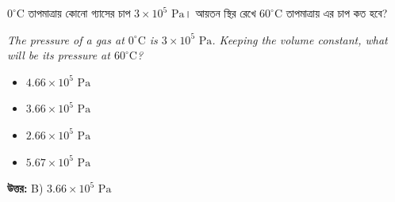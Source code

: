 \documentclass[12pt, a4paper]{article}
\begin{document}
\vspace{2em}
\begin{tcolorbox}[questionbox={প্রশ্ন (Question) 2}]
    \noindent
    $0^\circ\text{C}$ তাপমাত্রায় কোনো গ্যাসের চাপ $3 \times 10^5\text{ Pa}$। আয়তন স্থির রেখে $60^\circ\text{C}$ তাপমাত্রায় এর চাপ কত হবে?
    
    \vspace{0.8em}
    \begin{english}
    \noindent\textit{\color{darkgray}
    The pressure of a gas at $0^\circ\text{C}$ is $3 \times 10^5\text{ Pa}$. Keeping the volume constant, what will be its pressure at $60^\circ\text{C}$?
    }
    \end{english}
\end{tcolorbox}

\begin{itemize}[label={}, leftmargin=1cm, itemsep=0.5em]
    \item[\textbf{A)}] $4.66 \times 10^5\text{ Pa}$
    \item[\textbf{B)}] $3.66 \times 10^5\text{ Pa}$
    \item[\textbf{C)}] $2.66 \times 10^5\text{ Pa}$
    \item[\textbf{D)}] $5.67 \times 10^5\text{ Pa}$
\end{itemize}

\vspace{0.5em}
\begin{tcolorbox}[answerbox]
    \textbf{\color{success} উত্তর:} B) $3.66 \times 10^5\text{ Pa}$
\end{tcolorbox}
\vspace{1em}
\end{document}
